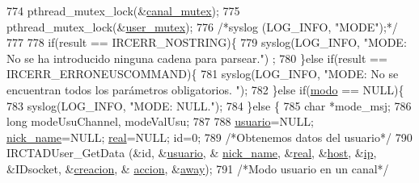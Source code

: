 \begin{DoxyCode}
{{{{{{{{{{774                         pthread\_mutex\_lock(&\hyperlink{_g-2361-06-_p1-_server_8c_ab86a544a49de18195048bac54dd3ac3e}{canal\_mutex});
775                         pthread\_mutex\_lock(&\hyperlink{_g-2361-06-_p1-_server_8c_a5dedd07a1144d2ab70b74a8e64b6a7c0}{user\_mutex});
776                         \textcolor{comment}{/*syslog (LOG\_INFO, "MODE");*/}
777 
778                         \textcolor{keywordflow}{if}(result == IRCERR\_NOSTRING)\{
779                                 syslog(LOG\_INFO, \textcolor{stringliteral}{"MODE: No se ha introducido ninguna cadena para parsear."})
      ;
780                         \}\textcolor{keywordflow}{else} \textcolor{keywordflow}{if}(result == IRCERR\_ERRONEUSCOMMAND)\{
781                                 syslog(LOG\_INFO, \textcolor{stringliteral}{"MODE: No se encuentran todos los parámetros obligatorios.
      "});
782                         \}\textcolor{keywordflow}{else} \textcolor{keywordflow}{if}(\hyperlink{_g-2361-06-_p1-_server_8c_a7451f0d59207b53af6178219fcf62677}{modo} == NULL)\{
783                                 syslog(LOG\_INFO, \textcolor{stringliteral}{"MODE: NULL."});
784                         \}\textcolor{keywordflow}{else} \{
785                                 \textcolor{keywordtype}{char} *mode\_msj; 
786                                 \textcolor{keywordtype}{long} modeUsuChannel, modeValUsu; 
787 
788                                 \hyperlink{_g-2361-06-_p1-_server_8c_a0147a5b81499984f9cb00379a8cb84af}{usuario}=NULL; \hyperlink{_g-2361-06-_p1-_server_8c_aabbf66718cda228b924a4a9441eadf62}{nick\_name}=NULL; 
      \hyperlink{_g-2361-06-_p1-_server_8c_af832f551e1c343666c3d2a55834139a0}{real}=NULL; \textcolor{keywordtype}{id}=0;
789                                 \textcolor{comment}{/*Obtenemos datos del usuario*/}
790                                 IRCTADUser\_GetData (&\textcolor{keywordtype}{id}, &\hyperlink{_g-2361-06-_p1-_server_8c_a0147a5b81499984f9cb00379a8cb84af}{usuario}, &
      \hyperlink{_g-2361-06-_p1-_server_8c_aabbf66718cda228b924a4a9441eadf62}{nick\_name}, &\hyperlink{_g-2361-06-_p1-_server_8c_af832f551e1c343666c3d2a55834139a0}{real}, &\hyperlink{_g-2361-06-_p1-_server_8c_a1c2046dcb30a629d6d9f45ff8f403f12}{host}, &\hyperlink{_g-2361-06-_p1-_server_8c_afbc356cd0e25d1dbbece7c10fd025fa6}{ip}, &IDsocket, &\hyperlink{_g-2361-06-_p1-_server_8c_a26292066ca0d17922eadee4161542ab9}{creacion}, &
      \hyperlink{_g-2361-06-_p1-_server_8c_a93e785c991445d8b8ee99c2e51242d5a}{accion}, &\hyperlink{_g-2361-06-_p1-_server_8c_adf86742e21384f58f8999d8317e6a370}{away});
791                                 \textcolor{comment}{/*Modo usuario en un canal*/}
}}}}}}}}}}
\end{DoxyCode}
